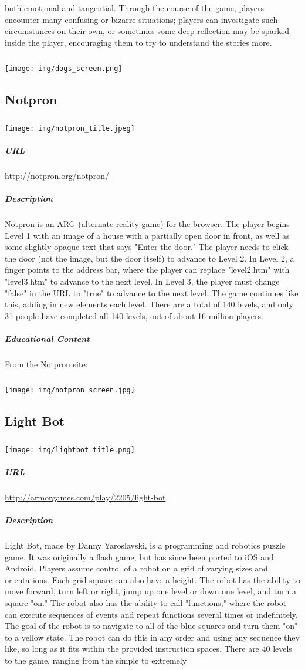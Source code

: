 both emotional and tangential. Through the course of the game, players encounter many confusing or bizarre situations; players can investigate such circumstances on their own, or sometimes some deep reflection may be sparked inside the player, encouraging them to try to understand the stories more.\subparagraph{}\texttt{[image: img/dogs\_screen.png]}\subsection{Notpron}\subparagraph{}\texttt{[image: img/notpron\_title.jpeg]}\subparagraph{URL}\url{http://notpron.org/notpron/}\subparagraph{Description}Notpron is an ARG (alternate-reality game) for the browser. The player begins Level 1 with an image of a house with a partially open door in front, as well as some slightly opaque text that says "Enter the door." The player needs to click the door (not the image, but the door itself) to advance to Level 2. In Level 2, a finger points to the address bar, where the player can replace "level2.htm" with "level3.htm" to advance to the next level. In Level 3, the player must change "false" in the URL to "true" to advance to the next level. The game continues like this, adding in new elements each level. There are a total of 140 levels, and only 31 people have completed all 140 levels, out of about 16 million players.\subparagraph{Educational Content}From the Notpron site: \subparagraph{}\texttt{[image: img/notpron\_screen.jpg]}\subsection{Light Bot}\subparagraph{}\texttt{[image: img/lightbot\_title.png]}\subparagraph{URL}\url{http://armorgames.com/play/2205/light-bot}\subparagraph{Description}Light Bot, made by Danny Yaroslavski, is a programming and robotics puzzle game. It was originally a flash game, but has since been ported to iOS and Android. Players assume control of a robot on a grid of varying sizes and orientations. Each grid square can also have a height. The robot has the ability to move forward, turn left or right, jump up one level or down one level, and turn a square "on." The robot also has the ability to call "functions," where the robot can execute sequences of events and repeat functions several times or indefinitely. The goal of the robot is to navigate to all of the blue squares and turn them "on" to a yellow state. The robot can do this in any order and using any sequence they like, so long as it fits within the provided instruction spaces. There are 40 levels to the game, ranging from the simple to extremely 
